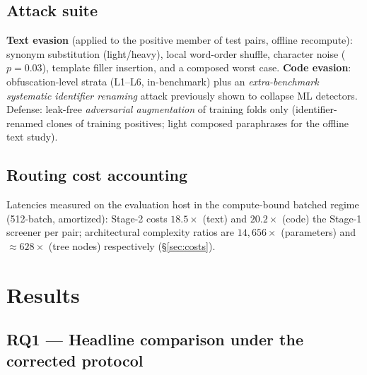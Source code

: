 \documentclass[conference]{IEEEtran}
\begin{document}
\subsection{Attack suite}
\textbf{Text evasion} (applied to the positive member of test pairs, offline recompute):
synonym substitution (light/heavy), local word-order shuffle, character noise ($p{=}0.03$),
template filler insertion, and a composed worst case. \textbf{Code evasion}: obfuscation-level
strata (L1--L6, in-benchmark) plus an \emph{extra-benchmark systematic identifier renaming}
attack previously shown to collapse ML detectors. Defense: leak-free \emph{adversarial
augmentation} of training folds only (identifier-renamed clones of training positives; light
composed paraphrases for the offline text study).

\subsection{Routing cost accounting}
Latencies measured on the evaluation host in the compute-bound batched regime (512-batch,
amortized): Stage-2 costs $18.5\times$ (text) and $20.2\times$ (code) the Stage-1 screener per
pair; architectural complexity ratios are $14{,}656\times$ (parameters) and $\approx$$628\times$
(tree nodes) respectively (\S\ref{sec:costs}).

\section{Results}
\label{sec:results}

\subsection{RQ1 --- Headline comparison under the corrected protocol}
\label{sec:headline}
\end{document}
